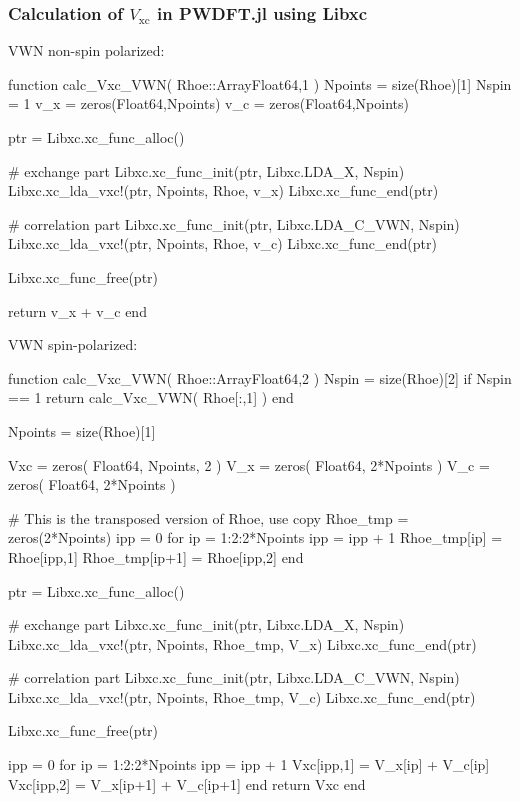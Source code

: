 \subsubsection{Calculation of $V_{\mathrm{xc}}$ in \textsf{PWDFT.jl} using Libxc}

VWN non-spin polarized:
\begin{juliacode}
function calc_Vxc_VWN( Rhoe::Array{Float64,1} )
    Npoints = size(Rhoe)[1]
    Nspin = 1
    v_x = zeros(Float64,Npoints)
    v_c = zeros(Float64,Npoints)

    ptr = Libxc.xc_func_alloc()

    # exchange part
    Libxc.xc_func_init(ptr, Libxc.LDA_X, Nspin)
    Libxc.xc_lda_vxc!(ptr, Npoints, Rhoe, v_x)
    Libxc.xc_func_end(ptr)

    # correlation part
    Libxc.xc_func_init(ptr, Libxc.LDA_C_VWN, Nspin)
    Libxc.xc_lda_vxc!(ptr, Npoints, Rhoe, v_c)
    Libxc.xc_func_end(ptr)

    Libxc.xc_func_free(ptr)

    return v_x + v_c
end
\end{juliacode}

VWN spin-polarized:
\begin{juliacode}
function calc_Vxc_VWN( Rhoe::Array{Float64,2} )
    Nspin = size(Rhoe)[2]
    if Nspin == 1
        return calc_Vxc_VWN( Rhoe[:,1] )
    end

    Npoints = size(Rhoe)[1]

    Vxc = zeros( Float64, Npoints, 2 )
    V_x = zeros( Float64, 2*Npoints )
    V_c = zeros( Float64, 2*Npoints )

    # This is the transposed version of Rhoe, use copy
    Rhoe_tmp = zeros(2*Npoints)
    ipp = 0
    for ip = 1:2:2*Npoints
        ipp = ipp + 1
        Rhoe_tmp[ip] = Rhoe[ipp,1]
        Rhoe_tmp[ip+1] = Rhoe[ipp,2]
    end

    ptr = Libxc.xc_func_alloc()

    # exchange part
    Libxc.xc_func_init(ptr, Libxc.LDA_X, Nspin)
    Libxc.xc_lda_vxc!(ptr, Npoints, Rhoe_tmp, V_x)
    Libxc.xc_func_end(ptr)

    # correlation part
    Libxc.xc_func_init(ptr, Libxc.LDA_C_VWN, Nspin)
    Libxc.xc_lda_vxc!(ptr, Npoints, Rhoe_tmp, V_c)
    Libxc.xc_func_end(ptr)

    Libxc.xc_func_free(ptr)

    ipp = 0
    for ip = 1:2:2*Npoints
        ipp = ipp + 1
        Vxc[ipp,1] = V_x[ip] + V_c[ip]
        Vxc[ipp,2] = V_x[ip+1] + V_c[ip+1]
    end
    return Vxc
end
\end{juliacode}

